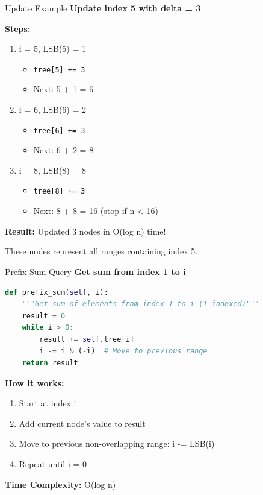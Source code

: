 \documentclass[aspectratio=169]{beamer}
\begin{document}
\begin{frame}{Update Example}
  \textbf{Update index 5 with delta = 3}

  \vspace{0.3cm}
  \textbf{Steps:}
  \begin{enumerate}
    \item i = 5, LSB(5) = 1
      \begin{itemize}
        \item \texttt{tree[5] += 3}
        \item Next: 5 + 1 = 6
      \end{itemize}
    \item i = 6, LSB(6) = 2
      \begin{itemize}
        \item \texttt{tree[6] += 3}
        \item Next: 6 + 2 = 8
      \end{itemize}
    \item i = 8, LSB(8) = 8
      \begin{itemize}
        \item \texttt{tree[8] += 3}
        \item Next: 8 + 8 = 16 (stop if n < 16)
      \end{itemize}
  \end{enumerate}

  \vspace{0.5cm}
  \textbf{Result:} Updated 3 nodes in O(log n) time!

  \vspace{0.3cm}
  These nodes represent all ranges containing index 5.
\end{frame}

\begin{frame}[fragile]{Prefix Sum Query}
  \textbf{Get sum from index 1 to i}

  \begin{lstlisting}[language=Python, basicstyle=\ttfamily\footnotesize]
def prefix_sum(self, i):
    """Get sum of elements from index 1 to i (1-indexed)"""
    result = 0
    while i > 0:
        result += self.tree[i]
        i -= i & (-i)  # Move to previous range
    return result
  \end{lstlisting}

  \vspace{0.5cm}
  \textbf{How it works:}
  \begin{enumerate}
    \item Start at index i
    \item Add current node's value to result
    \item Move to previous non-overlapping range: i -= LSB(i)
    \item Repeat until i = 0
  \end{enumerate}

  \vspace{0.5cm}
  \textbf{Time Complexity:} O(log n)
\end{frame}
\end{document}
